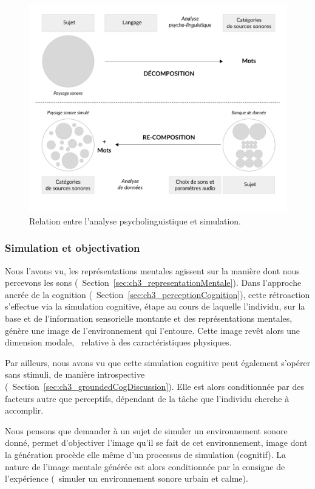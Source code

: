 \begin{figure}[t]
        \myfloatalign
        \includegraphics[width=.8\linewidth]{gfx/ch_4/1}
       \caption{Relation entre l'analyse psycholinguistique et simulation.}\label{fig:paradigmeSimu1}
\end{figure}
 
\subsubsection{Simulation et objectivation}

Nous l'avons vu, les représentations mentales agissent sur la manière dont nous percevons les sons (\cf~Section~\ref{sec:ch3_representationMentale}). Dans l'approche ancrée de la cognition (\cf~Section~\ref{sec:ch3_perceptionCognition}), cette rétroaction s'effectue via la simulation cognitive, étape au cours de laquelle l'individu, sur la base et de l'information sensorielle montante et des représentations mentales, génère une image de l'environnement qui l'entoure. Cette image revêt alors une dimension modale, \ie~relative à des caractéristiques physiques.

Par ailleurs, nous avons vu que cette simulation cognitive peut également s'opérer sans stimuli, de manière introspective (\cf~Section~\ref{sec:ch3_groundedCogDiscussion}). Elle est alors conditionnée par des facteurs autre que perceptifs, dépendant de la tâche que l'individu cherche à accomplir.

Nous pensons que demander à un sujet de simuler un environnement sonore donné, permet d'objectiver l'image qu'il se fait de cet environnement, image dont la génération procède elle même d'un processus de simulation (cognitif). La nature de l'image mentale générée est alors conditionnée par la consigne de l'expérience (\eg~simuler un environnement sonore urbain et calme).

